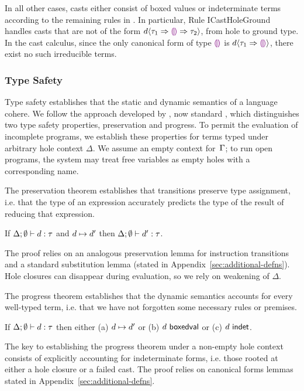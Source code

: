 In all other cases, casts either consist of boxed values or
indeterminate terms according to the remaining rules
in .
%
In particular, Rule {ICastHoleGround} handles casts that are not of
the form $d \langle{\tau_1}\Rightarrow{\textcolor{violet}{\llparenthesis}\textcolor{violet}{\rrparenthesis}}\Rightarrow{\tau_2}\rangle$, from hole to
ground type.
%
In the cast calculus, since the only canonical form of type $\textcolor{violet}{\llparenthesis}\textcolor{violet}{\rrparenthesis}$
is $d \langle{\tau_1}\Rightarrow{\textcolor{violet}{\llparenthesis}\textcolor{violet}{\rrparenthesis}}\rangle$, there exist no such
irreducible terms.

\subsubsection{Type Safety} 
%
Type safety establishes that the static and dynamic semantics of a
language cohere.
%
We follow the approach developed by \citet{wright94:_type_soundness},
now standard \cite{pfpl}, which distinguishes two type safety
properties, preservation and progress.
%
To permit the evaluation of incomplete programs, we establish these
properties for terms typed under arbitrary hole context $\Delta$.
%
We assume an empty context for~$\Gamma$; to run open programs, the
system may treat free variables as empty holes with a corresponding
name.

The preservation theorem establishes that transitions preserve type
assignment, i.e. that the type of an expression accurately predicts
the type of the result of reducing that expression.

\begin{thm}[Preservation]
  If $\Delta; \emptyset \vdash d : \tau$ and
  $d \mapsto d'$ then
  $\Delta; \emptyset \vdash d' : \tau$.
\end{thm}
\noindent
%
The proof relies on an analogous preservation lemma for instruction
transitions and a standard substitution lemma (stated in
Appendix~\ref{sec:additional-defns}).
%
Hole closures can disappear during evaluation, so we rely on weakening
of $\Delta$.

The progress theorem establishes that the dynamic semantics accounts
for every well-typed term, i.e. that we have not forgotten some
necessary rules or premises.
%
\begin{thm}[Progress]
  If $\Delta; \emptyset \vdash d : \tau$ then either
  (a) $d \mapsto d'$ or
  (b) $d~\mathsf{boxedval}$ or 
  (c) $d~\mathsf{indet}$.
\end{thm}
\noindent
The key to establishing the progress theorem under a non-empty hole
context consists of explicitly accounting for indeterminate forms,
i.e. those rooted at either a hole closure or a failed cast.
%
The proof relies on canonical forms lemmas stated in
Appendix~\ref{sec:additional-defns}.

